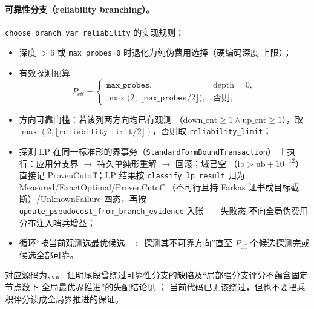 \paragraph{可靠性分支（reliability branching）。}
\texttt{choose\_branch\_var\_reliability} 的实现规则：
\begin{itemize}
  \item 深度 $>6$ 或 \texttt{max\_probes=0} 时退化为纯伪费用选择（硬编码深度
        上限）；
  \item 有效探测预算
        \begin{equation}
          P_{\mathrm{eff}}=
          \begin{cases}
            \texttt{max\_probes}, & \mathrm{depth}=0,\\
            \max\bigl(2,\ \lfloor\texttt{max\_probes}/2\rfloor\bigr), & \text{否则};
          \end{cases}
        \end{equation}
  \item 方向可靠门槛：若该列两方向均已有观测
        （$\mathrm{down\_cnt}\ge1\land\mathrm{up\_cnt}\ge1$），取
        $\max(2,\lfloor\texttt{reliability\_limit}/2\rfloor)$，否则取
        \texttt{reliability\_limit}；
  \item 探测 LP 在同一标准形的界事务（\texttt{StandardFormBoundTransaction}）
        上执行：应用分支界 $\to$ 持久单纯形重解 $\to$ 回滚；域已空
        （$\mathrm{lb}>\mathrm{ub}+10^{-12}$）直接记 ProvenCutoff；LP 结果按
        \texttt{classify\_lp\_result} 归为 Measured/ExactOptimal/ProvenCutoff
        （不可行且持 Farkas 证书或目标截断）/UnknownFailure 四态，再按
        \texttt{update\_pseudocost\_from\_branch\_evidence} 入账——失败态
        \textbf{不}向全局伪费用分布注入哨兵增益；
  \item 循环``按当前观测选最优候选 $\to$ 探测其不可靠方向''直至 $P_{\mathrm{eff}}$
        个候选探测完或候选全部可靠。
\end{itemize}
对应源码为、、。
证明尾段曾绕过可靠性分支的缺陷及``局部强分支评分不蕴含固定节点数下
全局最优界推进''的失配结论见
；
当前代码已无该绕过，但也不要把乘积评分读成全局界推进的保证。

